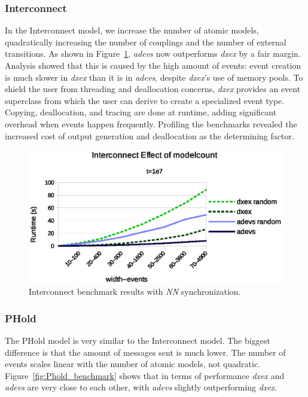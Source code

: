 \subsubsection{Interconnect}
\label{4-seq-Interconnect}
In the Interconnect model, we increase the number of atomic models, quadratically increasing the number of couplings and the number of external transitions.
As shown in Figure~\ref{fig:Interconnect_benchmark}, \textit{adevs} now outperforms \textit{dxex} by a fair margin.
Analysis showed that this is caused by the high amount of events: event creation is much slower in \textit{dxex} than it is in \textit{adevs}, despite \textit{dxex}'s use of memory pools.
To shield the user from threading and deallocation concerns, \textit{dxex} provides an event superclass from which the user can derive to create a specialized event type.
Copying, deallocation, and tracing are done at runtime, adding significant overhead when events happen frequently.
Profiling the benchmarks revealed the increased cost of output generation and deallocation as the determining factor.

\begin{figure}
	\center
	\includegraphics[width=\columnwidth]{fig/interconnect_sequential.eps}
	\caption{Interconnect benchmark results with \textit{NN} synchronization.}
	\label{fig:Interconnect_benchmark}
\end{figure}

\subsubsection{PHold}
\label{4-seq-PHold}
The PHold model is very similar to the Interconnect model.
The biggest difference is that the amount of messages sent is much lower.
The number of events scales linear with the number of atomic models, not quadratic.
Figure~\ref{fig:Phold_benchmark} shows that in terms of performance \textit{dxex} and \textit{adevs} are very close to each other, with \textit{adevs} slightly outperforming \textit{dxex}.

